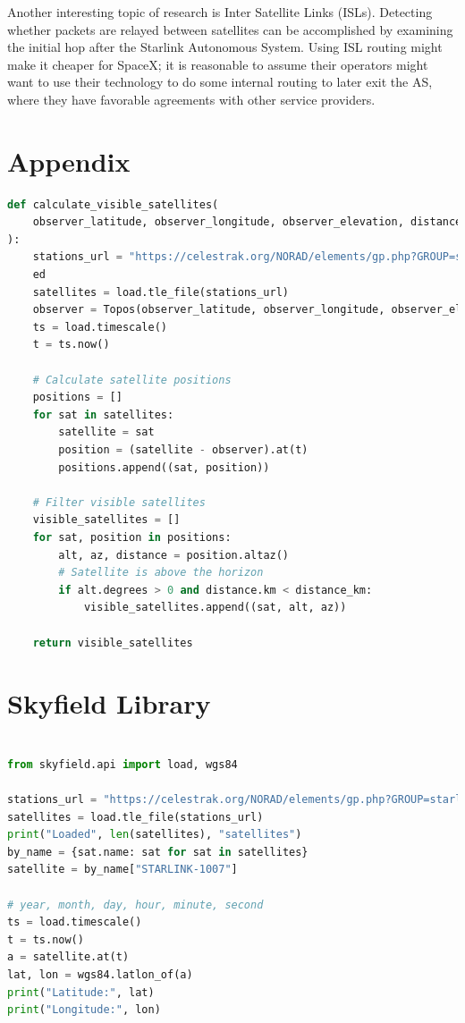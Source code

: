 \documentclass[IN,11pt,twoside,openright,idp,english]{tumthesis}
\begin{document}
Another interesting topic of research is Inter Satellite Links (ISLs). Detecting whether packets are relayed between satellites can be accomplished by examining the initial hop after the Starlink Autonomous System. Using ISL routing might make it cheaper for SpaceX; it is reasonable to assume their operators might want to use their technology to do some internal routing to later exit the AS, where they have favorable agreements with other service providers.


\appendix
\chapter{Appendix}

\begin{lstlisting}[language=python,caption={the \texttt{calculate\_visible\_satellites} function},captionpos=b]
def calculate_visible_satellites(
    observer_latitude, observer_longitude, observer_elevation, distance_km
):
    stations_url = "https://celestrak.org/NORAD/elements/gp.php?GROUP=starlink&FORMAT=tle"
    ed
    satellites = load.tle_file(stations_url)
    observer = Topos(observer_latitude, observer_longitude, observer_elevation)
    ts = load.timescale()
    t = ts.now()

    # Calculate satellite positions
    positions = []
    for sat in satellites:
        satellite = sat
        position = (satellite - observer).at(t)
        positions.append((sat, position))

    # Filter visible satellites
    visible_satellites = []
    for sat, position in positions:
        alt, az, distance = position.altaz()
        # Satellite is above the horizon
        if alt.degrees > 0 and distance.km < distance_km:
            visible_satellites.append((sat, alt, az))

    return visible_satellites
\end{lstlisting}

\chapter{Skyfield Library}
\label{app:sky}

\begin{lstlisting}[language=python,caption={retrieving a Satellite's position using the Satname},captionpos=b]

from skyfield.api import load, wgs84

stations_url = "https://celestrak.org/NORAD/elements/gp.php?GROUP=starlink&FORMAT=tle"
satellites = load.tle_file(stations_url)
print("Loaded", len(satellites), "satellites")
by_name = {sat.name: sat for sat in satellites}
satellite = by_name["STARLINK-1007"]

# year, month, day, hour, minute, second
ts = load.timescale()
t = ts.now()
a = satellite.at(t)
lat, lon = wgs84.latlon_of(a)
print("Latitude:", lat)
print("Longitude:", lon)
\end{lstlisting}

\clearpage
\pagestyle{thesischapter}
\cleardoublepage
{}
\printbibliography[heading=bibintoc]
\clearpage
\pagestyle{empty}
\end{document}
